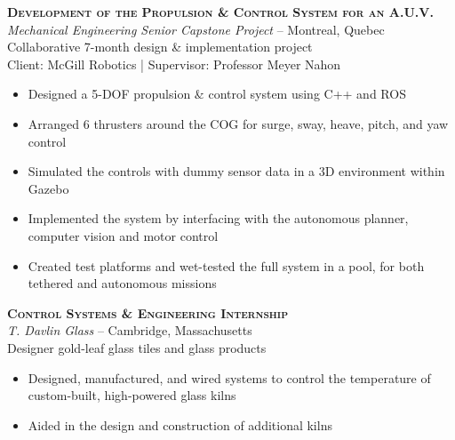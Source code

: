 \documentclass[12pt, letterpaper]{article}
\newcommand{\years}[1]{\marginnote{\footnotesize #1}} %
\begin{document}
\clearpage

	\begin{samepage}
		\years{9/2013 - 5/2014} \textbf{\scshape Development of the Propulsion \& Control System for an A.U.V.}\\
		{\textit{Mechanical Engineering Senior Capstone Project}} -- Montreal, Quebec\\
		{\small Collaborative 7-month design \& implementation project}\\
		{\small Client: McGill Robotics | Supervisor: Professor Meyer Nahon}
		\begin{itemize}
			\item Designed a 5-DOF propulsion \& control system using C++ and ROS
			\item Arranged 6 thrusters around the COG for surge, sway, heave, pitch, and yaw control
			\item Simulated the controls with dummy sensor data in a 3D environment within Gazebo 
			\item Implemented the system by interfacing with the autonomous planner, computer vision and motor control
			\item Created test platforms and wet-tested the full system in a pool, for both tethered and autonomous missions
		\end{itemize}
	\end{samepage}
	\vspace{.1in}


	\begin{samepage}
		\years{Summer 2013} \textbf{\scshape Control Systems \& Engineering Internship}\\
		\textit{T. Davlin Glass} -- Cambridge, Massachusetts\\
		{\small Designer gold-leaf glass tiles and glass products}
		\begin{itemize}
			\item Designed, manufactured, and wired systems to control the temperature of custom-built, high-powered glass kilns
			\item Aided in the design and construction of additional kilns
		\end{itemize}
	\end {samepage}
	\vspace{.1in}
\end{document}
